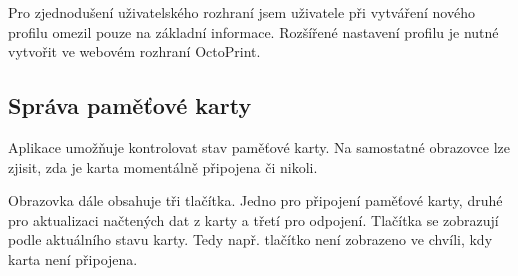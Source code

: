 Pro zjednodušení uživatelského rozhraní jsem uživatele při vytváření nového profilu omezil pouze na základní informace.
Rozšířené nastavení profilu je nutné vytvořit ve webovém rozhraní OctoPrint.

\subsection{Správa paměťové karty}

Aplikace umožňuje kontrolovat stav paměťové karty.
Na samostatné obrazovce lze zjisit, zda je karta momentálně připojena či nikoli.

Obrazovka dále obsahuje tři tlačítka.
Jedno pro připojení paměťové karty, druhé pro aktualizaci načtených dat z karty a třetí pro odpojení.
Tlačítka se zobrazují podle aktuálního stavu karty.
Tedy např. tlačítko  není zobrazeno ve chvíli, kdy karta není připojena.
